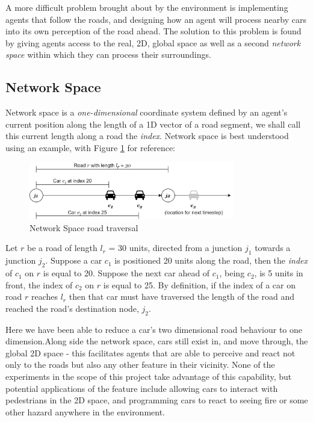 A more difficult problem brought about by the environment is implementing agents that follow the roads, and designing how an agent will process nearby cars into its own perception of the road ahead. The solution to this problem is found by giving agents access to the real, 2D, global space as well as a second \textit{network space} within which they can process their surroundings.

\subsection{Network Space}

Network space is a \textit{one-dimensional} coordinate system defined by an agent's current position along the length of a 1D vector of a road segment, we shall call this current length along a road the \textit{index}. Network space is best understood using an example, with Figure \ref{fig:network_space} for reference:

\begin{figure}[ht]
    \BlankLine
    \centering
    \includegraphics[width=0.8\textwidth]{images/network_space.png}
    \caption{Network Space road traversal}
    \label{fig:network_space}
    \BlankLine
\end{figure}
Let $r$ be a road of length $l_r$ = 30 units, directed from a junction $j_1$ towards a junction $j_2$. Suppose a car $c_1$ is positioned 20 units along the road, then the \textit{index} of $c_1$ on $r$ is equal to 20. Suppose the next car ahead of $c_1$, being $c_2$, is 5 units in front, the index of $c_2$ on $r$ is equal to 25. By definition, if the index of a car on road $r$ reaches $l_r$ then that car must have traversed the length of the road and reached the road's destination node, $j_2$.

Here we have been able to reduce a car's two dimensional road behaviour to one dimension.Along side the network space, cars still exist in, and move through, the global 2D space - this facilitates agents that are able to perceive and react not only to the roads but also any other feature in their vicinity. None of the experiments in the scope of this project take advantage of this capability, but potential applications of the feature include allowing cars to interact with pedestrians in the 2D space, and programming cars to react to seeing fire or some other hazard anywhere in the environment. 

